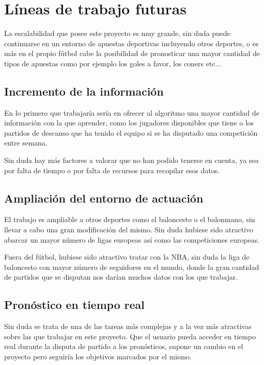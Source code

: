 \section{Líneas de trabajo futuras}
La escalabilidad que posee este proyecto es muy grande, sin duda puede continuarse en un entorno de apuestas deportivas incluyendo otros deportes, o es más en el propio fútbol cabe la posibilidad de pronosticar una mayor cantidad de tipos de apuestas como por ejemplo los goles a favor, los coners etc...

\subsection{Incremento de la información}
En lo primero que trabajaría sería en ofrecer al algoritmo una mayor cantidad de información con la que aprender, como los jugadores disponibles que tiene o los partidos de descanso que ha tenido el equipo si se ha disputado una competición entre semana. 

Sin duda hay más factores a valorar que no han podido tenerse en cuenta, ya sea por falta de tiempo o por falta de recursos para recopilar esos datos.

\subsection{Ampliación del entorno de actuación}
El trabajo es ampliable a otros deportes como el baloncesto o el balonmano, sin llevar a cabo una gran modificación del mismo. Sin duda hubiese sido atractivo abarcar un mayor número de ligas europeas así como las competiciones europeas.

Fuera del fútbol, hubiese sido atractivo tratar con la NBA, sin duda la liga de baloncesto con mayor número de seguidores en el mundo, donde la gran cantidad de partidos que se disputan nos darían muchos datos con los que trabajar.

\subsection{Pronóstico en tiempo real}
Sin duda se trata de una de las tareas más complejas y a la vez más atractivas sobre las que trabajar en este proyecto. Que el usuario pueda acceder en tiempo real durante la disputa de partido a los pronósticos, supone un cambio en el proyecto pero seguiría los objetivos marcados por el mismo.